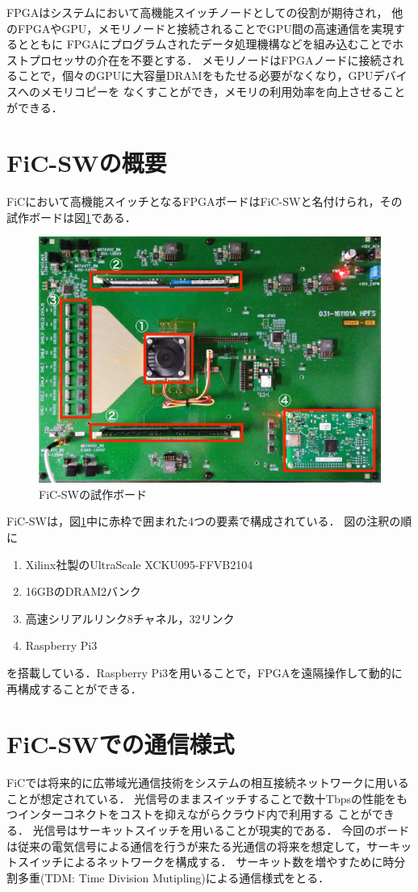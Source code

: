 {  FPGAはシステムにおいて高機能スイッチノードとしての役割が期待され，
  他のFPGAやGPU，メモリノードと接続されることでGPU間の高速通信を実現するとともに
  FPGAにプログラムされたデータ処理機構などを組み込むことでホストプロセッサの介在を不要とする．
  メモリノードはFPGAノードに接続されることで，個々のGPUに大容量DRAMをもたせる必要がなくなり，GPUデバイスへのメモリコピーを
  なくすことができ，メモリの利用効率を向上させることができる．
  
  \section{FiC-SWの概要}
  \label{sec:about_ficsw}
  FiCにおいて高機能スイッチとなるFPGAボードはFiC-SWと名付けられ，その試作ボードは図\ref{fig:ficsw}である．
  
  \begin{figure}[h]
    \centering
    \includegraphics[width=12cm]{./chap3/fig/ficsw.png}
    \caption{FiC-SWの試作ボード}
    \label{fig:ficsw}
  \end{figure}
  
  FiC-SWは，図\ref{fig:ficsw}中に赤枠で囲まれた4つの要素で構成されている．
  図の注釈の順に
  \begin{enumerate}
    \item Xilinx社製のUltraScale XCKU095-FFVB2104
    \item 16GBのDRAM2バンク
    \item 高速シリアルリンク8チャネル，32リンク
    \item Raspberry Pi3
  \end{enumerate}
  を搭載している．Raspberry Pi3を用いることで，FPGAを遠隔操作して動的に再構成することができる．
  
  \section{FiC-SWでの通信様式}
  \label{sec:ficsw_communication}
  FiCでは将来的に広帯域光通信技術をシステムの相互接続ネットワークに用いることが想定されている．
  光信号のままスイッチすることで数十Tbpsの性能をもつインターコネクトをコストを抑えながらクラウド内で利用する
  ことができる．
  光信号はサーキットスイッチを用いることが現実的である．
  今回のボードは従来の電気信号による通信を行うが来たる光通信の将来を想定して，サーキットスイッチによるネットワークを構成する．
  サーキット数を増やすために時分割多重(TDM: Time Division Mutipling)による通信様式をとる．
  
}
